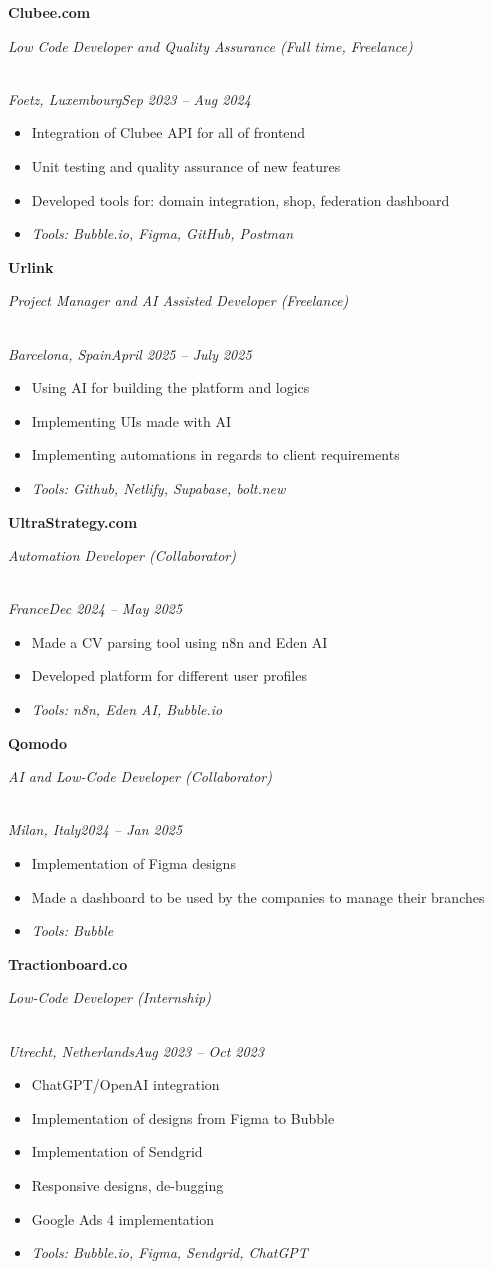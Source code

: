 \documentclass[a4paper,10pt]{article}
\newcommand{\role}[4]{\vspace{3pt}\noindent\hspace{0.6em}\parbox[t]{0.38\textwidth}{\raggedright\textbf{#1}}\hfill\parbox[t]{0.58\textwidth}{\raggedleft\textit{#2}}\\{\textit{#3}\hfill\textit{#4}}\vspace{1pt}}
\begin{document}
\role{Clubee.com}{Low Code Developer and Quality Assurance (Full time, Freelance)}{Foetz, Luxembourg}{Sep 2023 -- Aug 2024}
\begin{itemize}
\item Integration of Clubee API for all of frontend
\item Unit testing and quality assurance of new features
\item Developed tools for: domain integration, shop, federation dashboard
\item \textit{Tools: Bubble.io, Figma, GitHub, Postman}
\end{itemize}

\role{Urlink}{Project Manager and AI Assisted Developer (Freelance)}{Barcelona, Spain}{April 2025 -- July 2025}
\begin{itemize}
\item Using AI for building the platform and logics
\item Implementing UIs made with AI
\item Implementing automations in regards to client requirements
\item \textit{Tools: Github, Netlify, Supabase, bolt.new}
\end{itemize}

\role{UltraStrategy.com}{Automation Developer (Collaborator)}{France}{Dec 2024 -- May 2025}
\begin{itemize}
\item Made a CV parsing tool using n8n and Eden AI
\item Developed platform for different user profiles
\item \textit{Tools: n8n, Eden AI, Bubble.io}
\end{itemize}

\role{Qomodo}{AI and Low-Code Developer (Collaborator)}{Milan, Italy}{2024 -- Jan 2025}
\begin{itemize}
\item Implementation of Figma designs
\item Made a dashboard to be used by the companies to manage their branches
\item \textit{Tools: Bubble}
\end{itemize}

\role{Tractionboard.co}{Low-Code Developer (Internship)}{Utrecht, Netherlands}{Aug 2023 -- Oct 2023}
\begin{itemize}
\item ChatGPT/OpenAI integration
\item Implementation of designs from Figma to Bubble
\item Implementation of Sendgrid
\item Responsive designs, de-bugging
\item Google Ads 4 implementation
\item \textit{Tools: Bubble.io, Figma, Sendgrid, ChatGPT}
\end{itemize}
\end{document}
